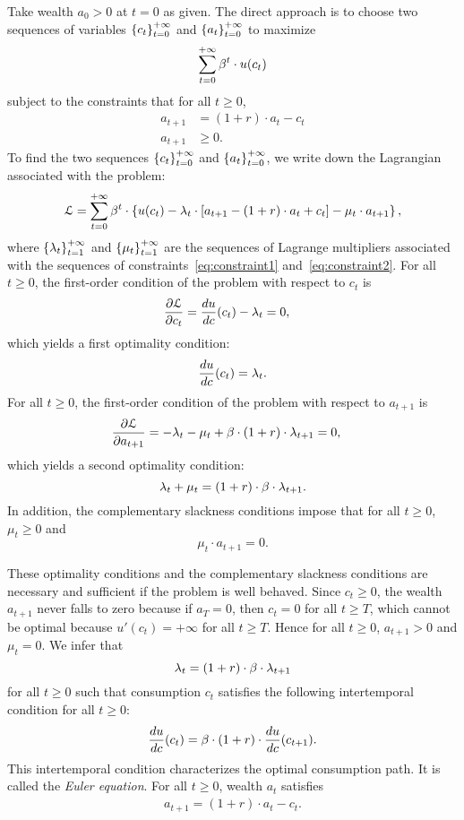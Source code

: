 \documentclass[letterpaper,12pt,leqno]{article}
\begin{document}
Take wealth $a_0>0$ at $t=0$ as given. The direct approach is to choose two sequences of variables $\left\lbrace c_t \right\rbrace_{t=0}^{+\infty}$ and $\left\lbrace a_t \right\rbrace_{t=0}^{+\infty}$ to maximize
\begin{equation*}
\sum_{t=0}^{+\infty}\beta^t \cdot u(c_t)
\end{equation*}
subject to the constraints that for all $t\geq 0$,
\begin{align}
a_{t+1}&=(1+r)\cdot a_{t}-c_{t}\label{eq:constraint1}\\
a_{t+1}&\geq 0.\label{eq:constraint2}
\end{align}
To find the two sequences $\left\lbrace c_t \right\rbrace_{t=0}^{+\infty}$ and $\left\lbrace a_t \right\rbrace_{t=0}^{+\infty}$, we write down the Lagrangian associated with the problem:
\begin{align*}
\mathcal{L}=\sum_{t=0}^{+\infty}\beta^t \cdot\left\lbrace u(c_t)-\lambda_{t}\cdot \left[ a_{t+1}-(1+r)\cdot a_{t}+c_{t} \right]-\mu_{t}\cdot a_{t+1} \right\rbrace,
\end{align*}
where  $\left\lbrace \lambda_t \right\rbrace_{t=1}^{+\infty}$ and $\left\lbrace \mu_t \right\rbrace_{t=1}^{+\infty}$ are the sequences of Lagrange multipliers associated with the sequences of constraints~\eqref{eq:constraint1} and~\eqref{eq:constraint2}. For all $t\geq 0$, the first-order condition of the problem with respect to $c_{t}$ is
\begin{align*}
\frac{\partial \mathcal{L}}{\partial c_{t}}&=\frac{d u}{d c}(c_{t})- \lambda_{t}=0,
\end{align*}
which yields a first optimality condition:
\[\frac{d u}{d c}(c_{t})=\lambda_{t}.\]
For all $t\geq 0$, the first-order condition of the problem with respect to $a_{t+1}$ is
\begin{align*}
\frac{\partial \mathcal{L}}{\partial a_{t+1}}&=-\lambda_{t}-\mu_{t}+ \beta\cdot(1+r)\cdot\lambda_{t+1} =0,
\end{align*}
which yields a second optimality condition:
\[\lambda_{t}+\mu_{t}=(1+r)\cdot \beta\cdot\lambda_{t+1}.\]
In addition, the complementary slackness conditions impose that for all $t\geq 0$, $\mu_{t}\geq 0$ and
\[\mu_{t}\cdot a_{t+1}=0.\]

These optimality conditions and the complementary slackness conditions are necessary and sufficient if the problem is well behaved. Since $c_{t}\geq 0$, the wealth $a_{t+1}$ never falls to zero because if $a_{T}=0$, then $c_{t}=0$ for all $t\geq T$, which cannot be optimal because $u'(c_{t})=+\infty$ for all $t\geq T$. Hence for all $t\geq 0$, $a_{t+1}>0$  and $\mu_{t}=0$. We infer that 
\[\lambda_t=(1+r)\cdot \beta\cdot\lambda_{t+1}\]
for all $t\geq 0$ such that consumption $c_{t}$ satisfies the following intertemporal condition for all $t\geq 0$:
\begin{align}
\frac{d u}{d c}(c_{t})= \beta\cdot(1+r)\cdot \frac{d u}{d c}(c_{t+1}).\label{eq:eulerdp}
\end{align}
This intertemporal condition characterizes the optimal consumption path. It is called the \textit{Euler equation}. For all $t\geq 0$, wealth $a_{t}$ satisfies
\begin{align*}
a_{t+1}=(1+r)\cdot a_{t}-c_{t}.
\end{align*}
\end{document}
